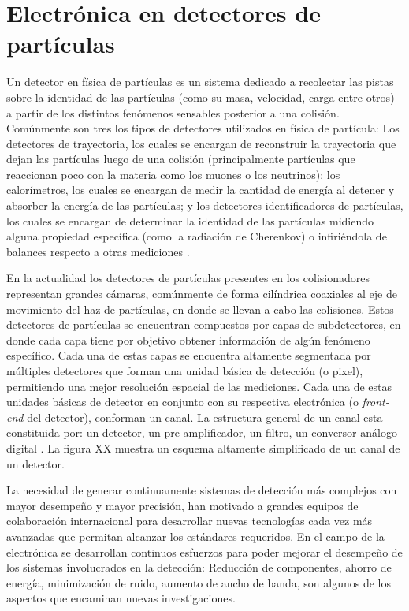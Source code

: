 \section{Electrónica en detectores de partículas}

 Un detector en física de partículas es un sistema dedicado a recolectar las pistas sobre la identidad de las partículas (como su masa, velocidad, carga entre otros) a partir de los distintos fenómenos sensables posterior a una colisión. Comúnmente son tres  los tipos de detectores utilizados en física de partícula: Los detectores de trayectoria, los cuales se encargan de reconstruir la trayectoria que dejan las partículas luego de una colisión (principalmente partículas que reaccionan poco con la materia como los muones o los neutrinos); los calorímetros, los cuales se encargan de medir la cantidad de energía al detener y absorber la energía de las partículas; y los detectores identificadores de partículas, los cuales se encargan de determinar la identidad de las partículas midiendo alguna propiedad específica (como la radiación de Cherenkov) o infiriéndola de balances respecto a otras mediciones \citep{cern101}.

En la actualidad los detectores de partículas presentes en los colisionadores representan  grandes cámaras, comúnmente de forma cilíndrica coaxiales al eje de movimiento del haz de partículas, en donde se llevan a cabo las colisiones. Estos detectores de partículas se encuentran compuestos por capas de subdetectores, en donde cada capa tiene por objetivo obtener información de algún fenómeno específico. Cada una de estas capas se encuentra altamente segmentada por múltiples detectores que forman una unidad básica de detección (o pixel), permitiendo una mejor resolución espacial de las mediciones. Cada una de estas unidades básicas de detector en conjunto con su respectiva electrónica (o \textit{front-end} del detector), conforman un canal. La estructura general de un canal esta constituida por: un detector, un pre amplificador, un filtro, un conversor análogo digital \citep{spieler2005semiconductor}. La figura XX muestra un esquema altamente simplificado de un canal de un detector.

La necesidad de generar continuamente sistemas de detección más complejos con mayor desempeño y mayor precisión, han motivado a grandes equipos de colaboración internacional para desarrollar nuevas tecnologías cada vez más avanzadas que permitan alcanzar los estándares requeridos. En el campo de la electrónica se desarrollan continuos esfuerzos para poder mejorar el desempeño de los sistemas involucrados en la detección: Reducción de componentes, ahorro de energía, minimización de ruido, aumento de ancho de banda, son algunos de los aspectos que encaminan nuevas investigaciones.

